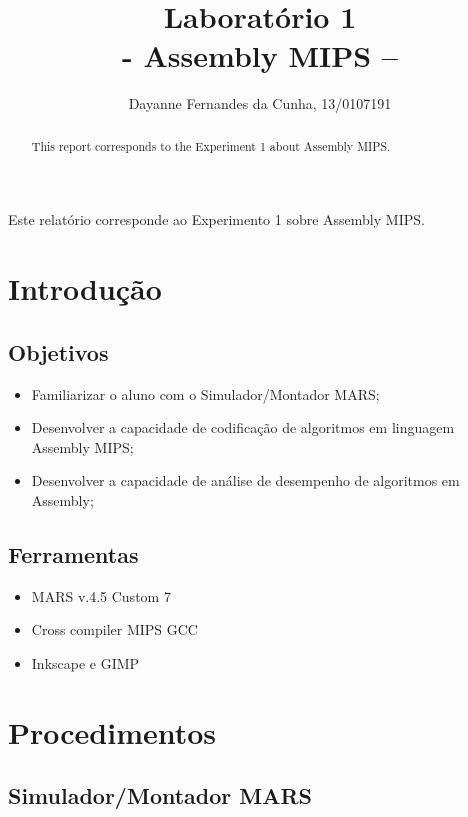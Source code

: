 \documentclass[12pt]{article}
\title{Laboratório 1\\- Assembly MIPS –}
\author{Dayanne Fernandes da Cunha, 13/0107191}
\begin{document}
 
\maketitle

 \begin{abstract}
	This report corresponds to the Experiment 1 about Assembly MIPS.
 \end{abstract}
 \begin{resumo} 
	Este relatório corresponde ao Experimento 1 sobre Assembly MIPS.
 \end{resumo}

\section{Introdução}
\label{sec:Introducao}

\subsection{Objetivos}
\label{sec:Objetivos}

\begin{itemize}
\item Familiarizar o aluno com o Simulador/Montador MARS;
\item Desenvolver a capacidade de codificação de algoritmos em linguagem Assembly MIPS;
\item Desenvolver a capacidade de análise de desempenho de algoritmos em Assembly;
\end{itemize}

\subsection{Ferramentas} 
\label{sec:Materiais}

\begin{itemize}
\item MARS v.4.5 Custom 7
\item Cross compiler MIPS GCC
\item Inkscape e GIMP
\end{itemize}

\section{Procedimentos}
\label{sec:Procedimentos}

\subsection{Simulador/Montador MARS}
\label{subsec:mars}
\end{document}
